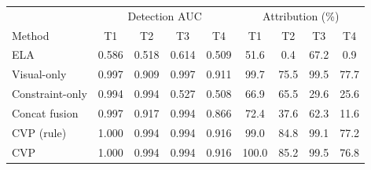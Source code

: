 \begin{tabular}{lcccc|cccc}
\toprule
 & \multicolumn{4}{c|}{Detection AUC} & \multicolumn{4}{c}{Attribution (\%)}\\
Method & T1 & T2 & T3 & T4 & T1 & T2 & T3 & T4\\
\midrule
ELA & 0.586 & 0.518 & 0.614 & 0.509 & 51.6 & 0.4 & 67.2 & 0.9\\
Visual-only & 0.997 & 0.909 & 0.997 & 0.911 & 99.7 & 75.5 & 99.5 & 77.7\\
Constraint-only & 0.994 & 0.994 & 0.527 & 0.508 & 66.9 & 65.5 & 29.6 & 25.6\\
Concat fusion & 0.997 & 0.917 & 0.994 & 0.866 & 72.4 & 37.6 & 62.3 & 11.6\\
CVP (rule) & 1.000 & 0.994 & 0.994 & 0.916 & 99.0 & 84.8 & 99.1 & 77.2\\
CVP & 1.000 & 0.994 & 0.994 & 0.916 & 100.0 & 85.2 & 99.5 & 76.8\\
\bottomrule
\end{tabular}
